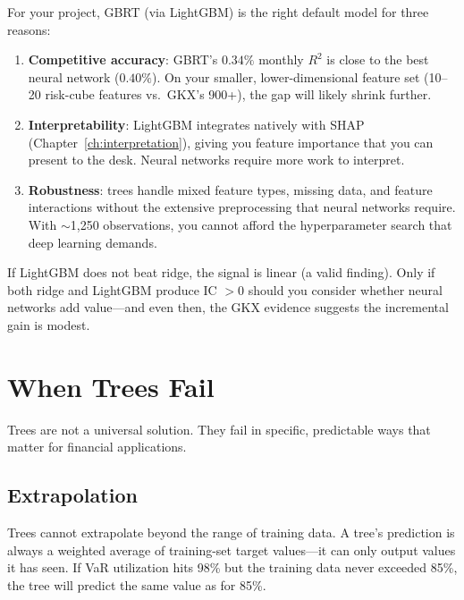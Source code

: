 \begin{projectconnection}
For your project, GBRT (via LightGBM) is the right default model for three reasons:
\begin{enumerate}[nosep]
  \item \textbf{Competitive accuracy}: GBRT's $0.34\%$ monthly $R^2$ is close to the best neural network ($0.40\%$). On your smaller, lower-dimensional feature set (10--20 risk-cube features vs.\ GKX's 900+), the gap will likely shrink further.
  \item \textbf{Interpretability}: LightGBM integrates natively with SHAP (Chapter~\ref{ch:interpretation}), giving you feature importance that you can present to the desk. Neural networks require more work to interpret.
  \item \textbf{Robustness}: trees handle mixed feature types, missing data, and feature interactions without the extensive preprocessing that neural networks require. With $\sim$1,250 observations, you cannot afford the hyperparameter search that deep learning demands.
\end{enumerate}
If LightGBM does not beat ridge, the signal is linear (a valid finding).
Only if both ridge and LightGBM produce IC $> 0$ should you consider whether neural networks add value---and even then, the GKX evidence suggests the incremental gain is modest.
\end{projectconnection}

\section{When Trees Fail}
\label{sec:trees-fail}

Trees are not a universal solution.
They fail in specific, predictable ways that matter for financial applications.

\subsection{Extrapolation}

Trees cannot extrapolate beyond the range of training data.
A tree's prediction is always a weighted average of training-set target values---it can only output values it has seen.
If VaR utilization hits 98\% but the training data never exceeded 85\%, the tree will predict the same value as for 85\%.

